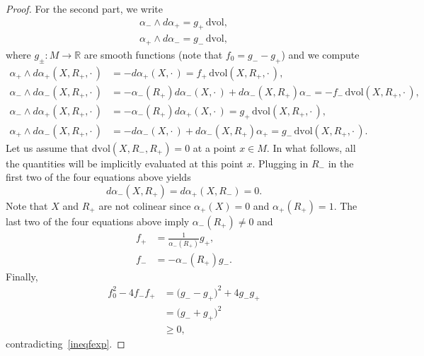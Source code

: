 \documentclass[10pt,a4paper]{amsart}
\newcommand{\R}{\mathbb{R}}
\begin{document}
\begin{proof}
For the second part, we write
\begin{align*}
\alpha_- \wedge d\alpha_+ = g_+ \, \mathrm{dvol}, \\
\alpha_+ \wedge d\alpha_- = g_- \, \mathrm{dvol},
\end{align*}
where $g_\pm : M \rightarrow \R$ are smooth functions (note that $f_0 = g_- - g_+$) and we compute
\begin{align*}
\alpha_+ \wedge d\alpha_+ (X,R_+,\cdot\, ) &= -d\alpha_+(X,\cdot\, ) = f_+\, \mathrm{dvol}(X,R_+, \cdot\, ), \\
\alpha_- \wedge d\alpha_- (X,R_+, \cdot\, ) &= -\alpha_-(R_+) d\alpha_-(X,\cdot\, ) + d\alpha_-(X, R_+)\alpha_-  = -f_-\, \mathrm{dvol}(X,R_+, \cdot\, ),\\
\alpha_- \wedge d\alpha_+ (X,R_+, \cdot\, ) &= - \alpha_-(R_+) d\alpha_+(X, \cdot\, ) = g_+\,  \mathrm{dvol}(X, R_+, \cdot\, ),\\
\alpha_+ \wedge d\alpha_- (X, R_+, \cdot\, ) &=  - d\alpha_-(X,\cdot\, ) + d\alpha_-(X, R_+) \alpha_+  = g_-\, \mathrm{dvol}(X, R_+, \cdot\, ).
\end{align*}
Let us assume that $\mathrm{dvol}(X, R_-, R_+)=0$ at a point $x \in M$. In what follows, all the quantities will be implicitly evaluated at this point $x$. Plugging in $R_-$ in the first two of the four equations above yields $$d\alpha_-(X,R_+) = d\alpha_+(X, R_-) = 0.$$
Note that $X$ and $R_+$ are not colinear since $\alpha_+(X)=0$ and $\alpha_+(R_+)=1$. The last two of the four equations above imply $\alpha_-(R_+) \neq 0$ and 
\begin{align*}
f_+ &= \frac{1}{\alpha_-(R_+)} g_+, \\
f_- &= -\alpha_-(R_+) g_-.
\end{align*}
Finally, 
\begin{align*}
f_0^2 - 4 f_- f_+ &= \big(g_- - g_+ \big)^2 + 4 g_-g_+ \\
&= \big(g_- + g_+\big)^2 \\
&\geq 0,
\end{align*}
contradicting~\eqref{ineqfexp}.
\end{proof}
\end{document}
